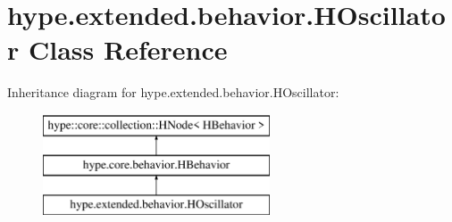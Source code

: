 \hypertarget{classhype_1_1extended_1_1behavior_1_1_h_oscillator}{\section{hype.\-extended.\-behavior.\-H\-Oscillator Class Reference}
\label{classhype_1_1extended_1_1behavior_1_1_h_oscillator}
}
Inheritance diagram for hype.\-extended.\-behavior.\-H\-Oscillator\-:\begin{figure}[H]
\begin{center}
\leavevmode
\includegraphics[height=3.000000cm]{classhype_1_1extended_1_1behavior_1_1_h_oscillator}
\end{center}
\end{figure}
